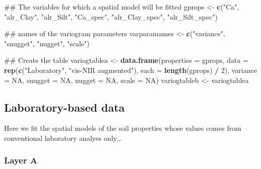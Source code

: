 \documentclass[]{book}
\newenvironment{Shaded}{\begin{snugshade}}{\end{snugshade}}
\newcommand{\DataTypeTok}[1]{\textcolor[rgb]{0.13,0.29,0.53}{#1}}
\newcommand{\DecValTok}[1]{\textcolor[rgb]{0.00,0.00,0.81}{#1}}
\newcommand{\KeywordTok}[1]{\textcolor[rgb]{0.13,0.29,0.53}{\textbf{#1}}}
\newcommand{\NormalTok}[1]{#1}
\newcommand{\OperatorTok}[1]{\textcolor[rgb]{0.81,0.36,0.00}{\textbf{#1}}}
\newcommand{\OtherTok}[1]{\textcolor[rgb]{0.56,0.35,0.01}{#1}}
\newcommand{\StringTok}[1]{\textcolor[rgb]{0.31,0.60,0.02}{#1}}
\begin{document}
\begin{Shaded}
\begin{Highlighting}[]
\NormalTok{## The variables for which a spatial model will be fitted}
\NormalTok{gprops <-}\StringTok{ }\KeywordTok{c}\NormalTok{(}\StringTok{"Ca"}\NormalTok{, }
            \StringTok{"alr_Clay"}\NormalTok{, }
            \StringTok{"alr_Silt"}\NormalTok{, }
            \StringTok{"Ca_spec"}\NormalTok{,}
            \StringTok{"alr_Clay_spec"}\NormalTok{, }
            \StringTok{"alr_Silt_spec"}\NormalTok{)}

\NormalTok{## names of the variogram parameters}
\NormalTok{varparamames <-}\StringTok{ }\KeywordTok{c}\NormalTok{(}\StringTok{"variance"}\NormalTok{, }\StringTok{"snugget"}\NormalTok{, }\StringTok{"nugget"}\NormalTok{, }\StringTok{"scale"}\NormalTok{)}

\NormalTok{## Create the table}
\NormalTok{variogtablea <-}\StringTok{ }\KeywordTok{data.frame}\NormalTok{(}\DataTypeTok{properties =}\NormalTok{ gprops,}
                           \DataTypeTok{data =} \KeywordTok{rep}\NormalTok{(}\KeywordTok{c}\NormalTok{(}\StringTok{"Laboratory"}\NormalTok{, }\StringTok{"vis-NIR augmented"}\NormalTok{), }
                                      \DataTypeTok{each =} \KeywordTok{length}\NormalTok{(gprops) }\OperatorTok{/}\StringTok{ }\DecValTok{2}\NormalTok{),}
                           \DataTypeTok{variance =} \OtherTok{NA}\NormalTok{,}
                           \DataTypeTok{snugget =} \OtherTok{NA}\NormalTok{,}
                           \DataTypeTok{nugget =} \OtherTok{NA}\NormalTok{,}
                           \DataTypeTok{scale =} \OtherTok{NA}\NormalTok{)}
\NormalTok{variogtableb <-}\StringTok{ }\NormalTok{variogtablea}
\end{Highlighting}
\end{Shaded}

\hypertarget{laboratory-based-data}{%
\subsection{Laboratory-based data}\label{laboratory-based-data}}

Here we fit the spatial models of the soil properties whose values comes from conventional laboratory analyes only\ldots{}

\hypertarget{layer-a}{%
\subsubsection{Layer A}\label{layer-a}}
\end{document}
